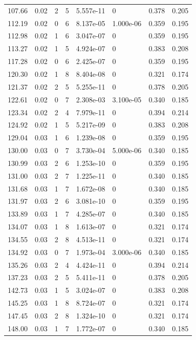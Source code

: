\documentclass[preview]{standalone}
\begin{document}
{{{\begin{tabular}{L{1.2cm}C{1.2cm} C{0.3cm}C{0.5cm} C{1.4cm}C{1.4cm} C{1.4cm}C{1.4cm}}
  107.66  &  0.02  & 2     &  5 &  5.557e-11  & 0  & 0.378 &  0.205   \\ 
  112.19  &  0.02  & 0     &  6 &  8.137e-05  & 1.000e-06  & 0.359 &  0.195   \\ 
  112.98  &  0.02  & 1     &  6 &  3.047e-07  & 0  & 0.359 &  0.195   \\ 
  113.27  &  0.02  & 1     &  5 &  4.924e-07  & 0  & 0.383 &  0.208   \\ 
  117.28  &  0.02  & 0     &  6 &  2.425e-07  & 0  & 0.359 &  0.195   \\ 
  120.30  &  0.02  & 1     &  8 &  8.404e-08  & 0  & 0.321 &  0.174   \\ 
  121.37  &  0.02  & 2     &  5 &  5.255e-11  & 0  & 0.378 &  0.205   \\ 
  122.61  &  0.02  & 0     &  7 &  2.308e-03  & 3.100e-05  & 0.340 &  0.185   \\ 
  123.34  &  0.02  & 2     &  4 &  7.979e-11  & 0  & 0.394 &  0.214   \\ 
  124.92  &  0.02  & 1     &  5 &  5.217e-09  & 0  & 0.383 &  0.208   \\ 
  129.04  &  0.03  & 1     &  6 &  1.239e-08  & 0  & 0.359 &  0.195   \\ 
  130.00  &  0.03  & 0     &  7 &  3.730e-04  & 5.000e-06  & 0.340 &  0.185   \\ 
  130.99  &  0.03  & 2     &  6 &  1.253e-10  & 0  & 0.359 &  0.195   \\ 
  131.00  &  0.03  & 2     &  7 &  1.225e-11  & 0  & 0.340 &  0.185   \\ 
  131.68  &  0.03  & 1     &  7 &  1.672e-08  & 0  & 0.340 &  0.185   \\ 
  131.97  &  0.03  & 2     &  6 &  3.081e-10  & 0  & 0.359 &  0.195   \\ 
  133.89  &  0.03  & 1     &  7 &  4.285e-07  & 0  & 0.340 &  0.185   \\ 
  134.07  &  0.03  & 1     &  8 &  1.613e-07  & 0  & 0.321 &  0.174   \\ 
  134.55  &  0.03  & 2     &  8 &  4.513e-11  & 0  & 0.321 &  0.174   \\ 
  134.92  &  0.03  & 0     &  7 &  1.973e-04  & 3.000e-06  & 0.340 &  0.185   \\ 
  135.26  &  0.03  & 2     &  4 &  4.424e-11  & 0  & 0.394 &  0.214   \\ 
  137.23  &  0.03  & 2     &  5 &  5.411e-11  & 0  & 0.378 &  0.205   \\ 
  142.73  &  0.03  & 1     &  5 &  3.024e-07  & 0  & 0.383 &  0.208   \\ 
  145.25  &  0.03  & 1     &  8 &  8.724e-07  & 0  & 0.321 &  0.174   \\ 
  147.45  &  0.03  & 2     &  8 &  1.324e-10  & 0  & 0.321 &  0.174   \\ 
  148.00  &  0.03  & 1     &  7 &  1.772e-07  & 0  & 0.340 &  0.185   \\ 
\hline 
\end{tabular} 

}}}
\end{document}
